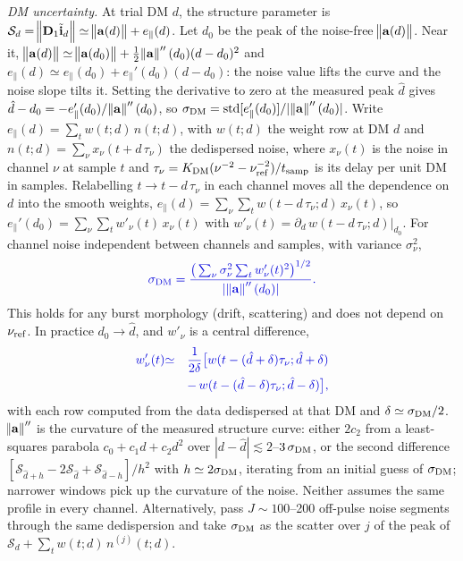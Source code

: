 \documentclass[twocolumn]{aastex631}
\providecommand{\DIFadd}[1]{{\protect\color{BLUE}#1}} %
\begin{document}
\textit{\DIFadd{DM uncertainty.}} \DIFadd{At trial DM $d$, the structure parameter is $\mathcal{S}_d=\norm{\mathbf{D}_1\tilde{\mathbf{i}}_d}\simeq\norm{\mathbf{a}(d)}+e_\parallel(d)$. Let $d_0$ be the peak of the noise-free $\norm{\mathbf{a}(d)}$. Near it, $\norm{\mathbf{a}(d)}\simeq\norm{\mathbf{a}(d_0)}+\tfrac12\norm{\mathbf{a}}''(d_0)(d-d_0)^2$ and $e_\parallel(d)\simeq e_\parallel(d_0)+e_\parallel'(d_0)(d-d_0)$: the noise value lifts the curve and the noise slope tilts it. Setting the derivative to zero at the measured peak $\hat d$ gives $\hat d-d_0=-e_\parallel'(d_0)/\norm{\mathbf{a}}''(d_0)$, so $\sigma_{\rm DM}={\rm std}[e_\parallel'(d_0)]/|\norm{\mathbf{a}}''(d_0)|$. Write $e_\parallel(d)=\sum_tw(t;d)\,n(t;d)$, with $w(t;d)$ the weight row at DM $d$ and $n(t;d)=\sum_{\nu}x_{\nu}(t+d\,\tau_{\nu})$ the dedispersed noise, where $x_{\nu}(t)$ is the noise in channel $\nu$ at sample $t$ and $\tau_{\nu}=K_{\rm DM}(\nu^{-2}-\nu_{\rm ref}^{-2})/t_{\rm samp}$ is its delay per unit DM in samples. Relabelling $t\to t-d\,\tau_{\nu}$ in each channel moves all the dependence on $d$ into the smooth weights, $e_\parallel(d)=\sum_{\nu}\sum_tw(t-d\,\tau_{\nu};d)\,x_{\nu}(t)$, so $e_\parallel'(d_0)=\sum_{\nu}\sum_tw'_{\nu}(t)\,x_{\nu}(t)$ with $w'_{\nu}(t)=\partial_d\,w(t-d\,\tau_{\nu};d)|_{d_0}$. For channel noise independent between channels and samples, with variance $\sigma_{\nu}^2$,
}\begin{eqnarray}
\DIFadd{\sigma_{\rm DM}=\frac{\big(\sum_{\nu}\sigma_{\nu}^2\sum_tw'_{\nu}(t)^2\big)^{1/2}}{|\norm{\mathbf{a}}''(d_0)|}.
\label{eqn:sigma_DM}
}\end{eqnarray}
\DIFadd{This holds for any burst morphology (drift, scattering) and does not depend on $\nu_{\rm ref}$. In practice $d_0\to\hat d$, and $w'_{\nu}$ is a central difference,
}\begin{eqnarray}
\DIFadd{w'_{\nu}(t)}&\DIFadd{\simeq}&\DIFadd{\frac{1}{2\delta}\big[w(t-(\hat d+\delta)\tau_{\nu};\hat d+\delta)\nonumber}\\
&&\DIFadd{-\,w(t-(\hat d-\delta)\tau_{\nu};\hat d-\delta)\big],\nonumber
}\end{eqnarray}
\DIFadd{with each row computed from the data dedispersed at that DM and $\delta\simeq\sigma_{\rm DM}/2$. $\norm{\mathbf{a}}''$ is the curvature of the measured structure curve: either $2c_2$ from a least-squares parabola $c_0+c_1d+c_2d^2$ over $|d-\hat d|\lesssim2$--$3\,\sigma_{\rm DM}$, or the second difference $[\mathcal{S}_{\hat d+h}-2\mathcal{S}_{\hat d}+\mathcal{S}_{\hat d-h}]/h^2$ with $h\simeq2\sigma_{\rm DM}$, iterating from an initial guess of $\sigma_{\rm DM}$; narrower windows pick up the curvature of the noise. Neither assumes the same profile in every channel. Alternatively, pass $J\sim100$--200 off-pulse noise segments through the same dedispersion and take $\sigma_{\rm DM}$ as the scatter over $j$ of the peak of $\mathcal{S}_d+\sum_tw(t;d)\,n^{(j)}(t;d)$.
}
\end{document}
